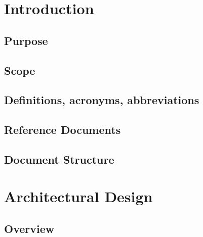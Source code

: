 \documentclass[12pt, a4paper]{article}
\title{
	\Huge{\textbf{\centerline{myTaxiService}}}
	\newline
	\huge{\textbf{D}esign \textbf{D}ocument}
}
\author{
	Monica Magoni 854091
	\\
	Alberto Cibari 852689
}
\date{\today}
\begin{document}
	\maketitle
	\newpage
	\renewcommand*\contentsname{\Huge{Contents}}
	\tableofcontents
	
	\newpage
	
    \section{Introduction}
    	
    	\subsection{Purpose}
    	
    	
    	\subsection{Scope}
    	
    	\subsection{Definitions, acronyms, abbreviations}
    	
    
        \subsection{Reference Documents}
    	
    
    	\subsection{Document Structure}
    	
    	
    	
    \newpage
    \section{Architectural Design}
    
    	\subsection{Overview}
    	    
    	
\end{document}
